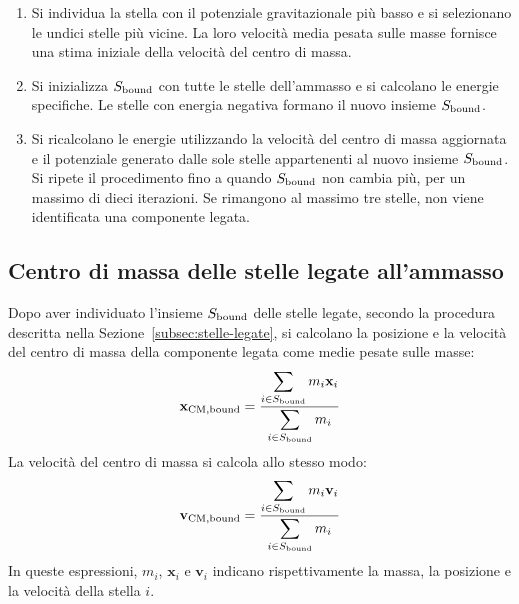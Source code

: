 \begin{enumerate}
	\item Si individua la stella con il potenziale gravitazionale più basso e si selezionano le undici stelle più vicine. La loro velocità media pesata sulle masse fornisce una stima iniziale della velocità del centro di massa.
	\item Si inizializza $S_{\mathrm{bound}}$ con tutte le stelle dell'ammasso e si calcolano le energie specifiche. Le stelle con energia negativa formano il nuovo insieme $S_{\mathrm{bound}}$.
	\item Si ricalcolano le energie utilizzando la velocità del centro di massa aggiornata e il potenziale generato dalle sole stelle appartenenti al nuovo insieme $S_{\mathrm{bound}}$. Si ripete il procedimento fino a quando $S_{\mathrm{bound}}$ non cambia più, per un massimo di dieci iterazioni. Se rimangono al massimo tre stelle, non viene identificata una componente legata.
\end{enumerate}
\subsection{Centro di massa delle stelle legate all'ammasso}
\label{subsec:centro-massa-legato}
Dopo aver individuato l'insieme $S_{\mathrm{bound}}$ delle stelle legate, secondo la procedura descritta nella Sezione~\ref{subsec:stelle-legate}, si calcolano la posizione e la velocità del centro di massa della componente legata come medie pesate sulle masse:
\begin{equation}
	\mathbf{x}_{\mathrm{CM,bound}} =
	\frac{\displaystyle\sum_{i\in S_{\mathrm{bound}}}m_i\mathbf{x}_i}
	{\displaystyle\sum_{i\in S_{\mathrm{bound}}}m_i}
	\label{eq:com-bound-position}
\end{equation}
La velocità del centro di massa si calcola allo stesso modo:
\begin{equation}
	\mathbf{v}_{\mathrm{CM,bound}} =
	\frac{\displaystyle\sum_{i\in S_{\mathrm{bound}}}m_i\mathbf{v}_i}
	{\displaystyle\sum_{i\in S_{\mathrm{bound}}}m_i}
	\label{eq:com-bound-velocity}
\end{equation}
In queste espressioni, $m_i$, $\mathbf{x}_i$ e $\mathbf{v}_i$ indicano rispettivamente la massa, la posizione e la velocità della stella $i$.
